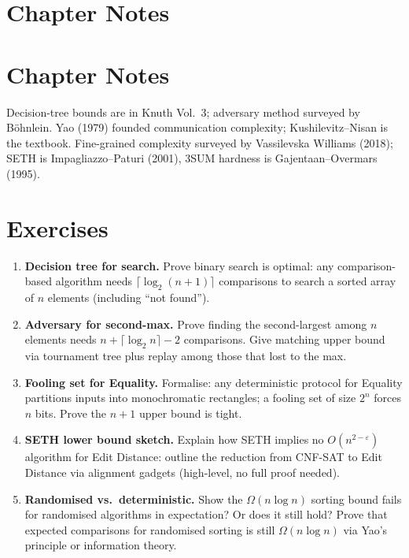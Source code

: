 \section{Chapter Notes}
\section{Chapter Notes}
Decision-tree bounds are in Knuth Vol.~3; adversary method surveyed by Böhnlein. Yao (1979) founded communication complexity; Kushilevitz--Nisan is the textbook. Fine-grained complexity surveyed by Vassilevska Williams (2018); SETH is Impagliazzo--Paturi (2001), 3SUM hardness is Gajentaan--Overmars (1995).

\section{Exercises}
\label{sec:ch08-exercises}
\begin{enumerate}[label=E8.\arabic*, leftmargin=*, itemsep=0.7em]
    \item \textbf{Decision tree for search.} Prove binary search is optimal: any comparison-based algorithm needs $\lceil\log_2(n+1)\rceil$ comparisons to search a sorted array of $n$ elements (including ``not found'').
    \item \textbf{Adversary for second-max.} Prove finding the second-largest among $n$ elements needs $n+\lceil\log_2 n\rceil-2$ comparisons. Give matching upper bound via tournament tree plus replay among those that lost to the max.
    \item \textbf{Fooling set for Equality.} Formalise: any deterministic protocol for Equality partitions inputs into monochromatic rectangles; a fooling set of size $2^n$ forces $n$ bits. Prove the $n+1$ upper bound is tight.
    \item \textbf{SETH lower bound sketch.} Explain how SETH implies no $O(n^{2-\varepsilon})$ algorithm for Edit Distance: outline the reduction from CNF-SAT to Edit Distance via alignment gadgets (high-level, no full proof needed).
    \item \textbf{Randomised vs.\ deterministic.} Show the $\Omega(n\log n)$ sorting bound fails for randomised algorithms in expectation? Or does it still hold? Prove that expected comparisons for randomised sorting is still $\Omega(n\log n)$ via Yao's principle or information theory.
\end{enumerate}
